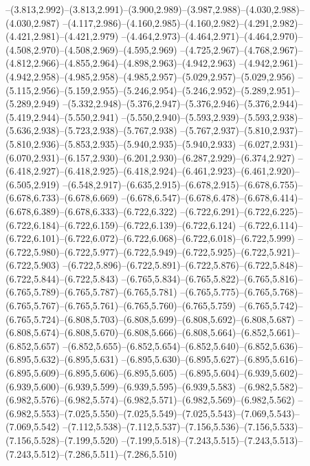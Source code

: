   --(3.813,2.992)--(3.813,2.991)--(3.900,2.989)--(3.987,2.988)--(4.030,2.988)--(4.030,2.987)%
  --(4.117,2.986)--(4.160,2.985)--(4.160,2.982)--(4.291,2.982)--(4.421,2.981)--(4.421,2.979)%
  --(4.464,2.973)--(4.464,2.971)--(4.464,2.970)--(4.508,2.970)--(4.508,2.969)--(4.595,2.969)%
  --(4.725,2.967)--(4.768,2.967)--(4.812,2.966)--(4.855,2.964)--(4.898,2.963)--(4.942,2.963)%
  --(4.942,2.961)--(4.942,2.958)--(4.985,2.958)--(4.985,2.957)--(5.029,2.957)--(5.029,2.956)%
  --(5.115,2.956)--(5.159,2.955)--(5.246,2.954)--(5.246,2.952)--(5.289,2.951)--(5.289,2.949)%
  --(5.332,2.948)--(5.376,2.947)--(5.376,2.946)--(5.376,2.944)--(5.419,2.944)--(5.550,2.941)%
  --(5.550,2.940)--(5.593,2.939)--(5.593,2.938)--(5.636,2.938)--(5.723,2.938)--(5.767,2.938)%
  --(5.767,2.937)--(5.810,2.937)--(5.810,2.936)--(5.853,2.935)--(5.940,2.935)--(5.940,2.933)%
  --(6.027,2.931)--(6.070,2.931)--(6.157,2.930)--(6.201,2.930)--(6.287,2.929)--(6.374,2.927)%
  --(6.418,2.927)--(6.418,2.925)--(6.418,2.924)--(6.461,2.923)--(6.461,2.920)--(6.505,2.919)%
  --(6.548,2.917)--(6.635,2.915)--(6.678,2.915)--(6.678,6.755)--(6.678,6.733)--(6.678,6.669)%
  --(6.678,6.547)--(6.678,6.478)--(6.678,6.414)--(6.678,6.389)--(6.678,6.333)--(6.722,6.322)%
  --(6.722,6.291)--(6.722,6.225)--(6.722,6.184)--(6.722,6.159)--(6.722,6.139)--(6.722,6.124)%
  --(6.722,6.114)--(6.722,6.101)--(6.722,6.072)--(6.722,6.068)--(6.722,6.018)--(6.722,5.999)%
  --(6.722,5.980)--(6.722,5.977)--(6.722,5.949)--(6.722,5.925)--(6.722,5.921)--(6.722,5.903)%
  --(6.722,5.896)--(6.722,5.891)--(6.722,5.876)--(6.722,5.848)--(6.722,5.844)--(6.722,5.843)%
  --(6.765,5.834)--(6.765,5.822)--(6.765,5.816)--(6.765,5.789)--(6.765,5.787)--(6.765,5.781)%
  --(6.765,5.775)--(6.765,5.768)--(6.765,5.767)--(6.765,5.761)--(6.765,5.760)--(6.765,5.759)%
  --(6.765,5.742)--(6.765,5.724)--(6.808,5.703)--(6.808,5.699)--(6.808,5.692)--(6.808,5.687)%
  --(6.808,5.674)--(6.808,5.670)--(6.808,5.666)--(6.808,5.664)--(6.852,5.661)--(6.852,5.657)%
  --(6.852,5.655)--(6.852,5.654)--(6.852,5.640)--(6.852,5.636)--(6.895,5.632)--(6.895,5.631)%
  --(6.895,5.630)--(6.895,5.627)--(6.895,5.616)--(6.895,5.609)--(6.895,5.606)--(6.895,5.605)%
  --(6.895,5.604)--(6.939,5.602)--(6.939,5.600)--(6.939,5.599)--(6.939,5.595)--(6.939,5.583)%
  --(6.982,5.582)--(6.982,5.576)--(6.982,5.574)--(6.982,5.571)--(6.982,5.569)--(6.982,5.562)%
  --(6.982,5.553)--(7.025,5.550)--(7.025,5.549)--(7.025,5.543)--(7.069,5.543)--(7.069,5.542)%
  --(7.112,5.538)--(7.112,5.537)--(7.156,5.536)--(7.156,5.533)--(7.156,5.528)--(7.199,5.520)%
  --(7.199,5.518)--(7.243,5.515)--(7.243,5.513)--(7.243,5.512)--(7.286,5.511)--(7.286,5.510)%
